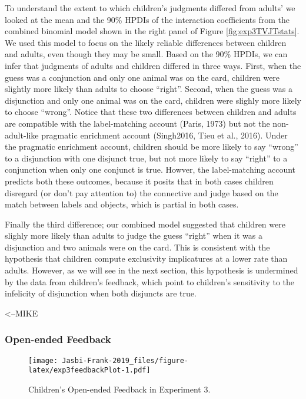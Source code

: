 \documentclass[,man,floatsintext]{apa6}
\begin{document}
To understand the extent to which children's judgments differed from adults' we looked at the mean and the 90\% HPDIs of the interaction coefficients from the combined binomial model shown in the right panel of Figure \ref{fig:exp3TVJTstats}. We used this model to focus on the likely reliable differences between children and adults, even though they may be small. Based on the 90\% HPDIs, we can infer that judgments of adults and children differed in three ways. First, when the guess was a conjunction and only one animal was on the card, children were slightly more likely than adults to choose \enquote{right}. Second, when the guess was a disjunction and only one animal was on the card, children were slighly more likely to choose \enquote{wrong}. Notice that these two differences between children and adults are compatible with the label-matching account (Paris, 1973) but not the non-adult-like pragmatic enrichment account (Singh2016, Tieu et al., 2016). Under the pragmatic enrichment account, children should be more likely to say \enquote{wrong} to a disjunction with one disjunct true, but not more likely to say \enquote{right} to a conjunction when only one conjunct is true. Howver, the label-matching account predicts both these outcomes, because it posits that in both cases children disregard (or don't pay attention to) the connective and judge based on the match between labels and objects, which is partial in both cases.

Finally the third difference; our combined model suggested that children were slighly more likely than adults to judge the guess \enquote{right} when it was a disjunction and two animals were on the card. This is consistent with the hypothesis that children compute exclusivity implicatures at a lower rate than adults. However, as we will see in the next section, this hypothesis is undermined by the data from children's feedback, which point to children's sensitivity to the infelicity of disjunction when both disjuncts are true.

\textless{}--MIKE

\hypertarget{open-ended-feedback}{%
\subsubsection{Open-ended Feedback}\label{open-ended-feedback}}

\begin{figure}
\centering
\texttt{[image: Jasbi-Frank-2019\_files/figure-latex/exp3feedbackPlot-1.pdf]}
\caption{\label{fig:exp3feedbackPlot}Children's Open-ended Feedback in Experiment 3.}
\end{figure}
\end{document}
